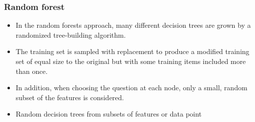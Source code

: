 \documentclass[aspectratio=169]{beamer}
\begin{document}

\begin{frame}
  \frametitle{Random forest}
  \begin{block}{}
    \begin{center}
      \begin{itemize}
      \item In the random forests approach, many different decision trees
        are grown by a randomized tree-building algorithm.
      \item The training set is sampled with replacement to produce a
        modified training set of equal size to the original but with some
        training items included more than once.
      \item In addition, when choosing the question at each node, only a
        small, random subset of the features is considered.
      \item Random decision trees from subsets of features or data point
      \end{itemize}
    \end{center}
  \end{block}
\end{frame}
\end{document}
